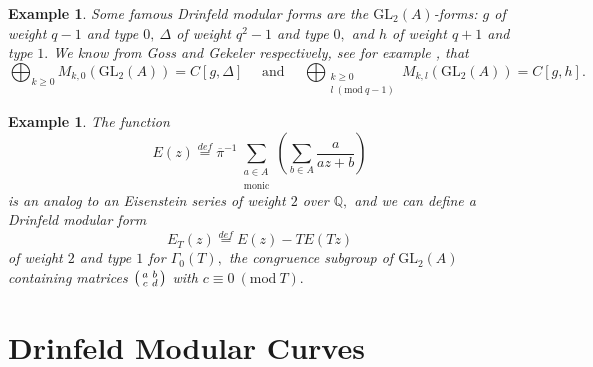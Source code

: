 \documentclass[11pt]{amsart}
\newtheorem{example}[theorem]{Example}
\theoremstyle{definition}
\newenvironment{psmallmatrix}
{\left(\begin{smallmatrix}}
	{\end{smallmatrix}\right)}
\numberwithin{equation}{section}
\newcommand{\GL}{\mathrm{GL}} 	%
\newcommand{\bbQ}{\mathbb{Q}}		%
\newcommand{\Mod}[1]{\ (\mathrm{mod}\ #1)}
\begin{document}
		\begin{example}
			Some famous Drinfeld modular forms are the $\GL_2(A)$-forms: $g$ of weight $q-1$ and type $0, ~\Delta$ of weight $q^2-1$ and type $0,$ and $h$ of weight $q+1$ and type $1.$ We know from Goss and Gekeler respectively, see for example \cite[Theorem $(3.12)$]{Gekeler-survey-Drinfeld-modular-forms}, that 
			\[\bigoplus_{k\geq 0} M_{k,0}(\GL_2(A))=C[g,\Delta] \quad \text{ and }\quad \bigoplus_{\substack{k\geq 0\\l\Mod{q-1}}} M_{k,l}(\GL_2(A))=C[g,h].\]
		\end{example}
		
		\begin{example}\cite[Section $8$]{Gekeler-Coeff}
		\label{example: Eisenstein series for Gamma0(T)}
			The function \[E(z)\overset{def}{=}\overline{\pi}^{-1}\sum\limits_{\substack{a\in A\\\text{monic}}}\left(\sum_{b\in A}\frac{a}{az+b}\right)\]
			is an analog to an Eisenstein series of weight $2$ over $\bbQ,$ and we can define a Drinfeld modular form 
			\[E_T(z)\overset{def}{=}E(z)-TE(Tz)\]
			of weight $2$ and type $1$ for $\Gamma_0(T),$ the congruence subgroup of $\GL_2(A)$ containing matrices $\displaystyle{\begin{psmallmatrix}a&b\\c&d\end{psmallmatrix}}$ with $c\equiv 0\Mod T.$
		\end{example}
		
		\section{Drinfeld Modular Curves}
		\label{s: Drinfeld modular curves}
		
\end{document}
